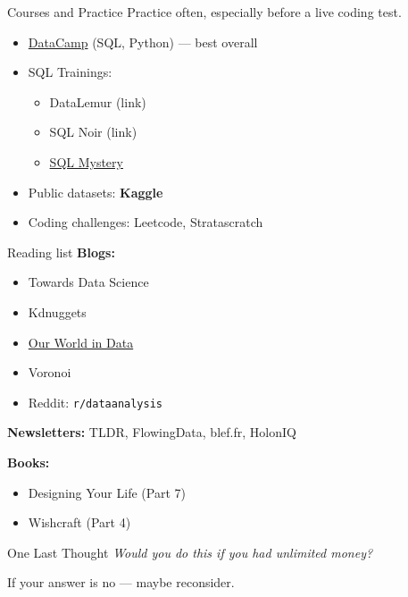 \documentclass[10pt,a4paper]{article}
\begin{document}
\begin{multicols}{3}
\begin{textboxGray}{Courses and Practice}
Practice often, especially before a live coding test.
\begin{itemize}
    \item  \href{https://datacamp.com/}{DataCamp} (SQL, Python) — best overall
    \item SQL Trainings:
    \begin{itemize}
        \item DataLemur (link)
        \item SQL Noir (link)
        \item \href{https://mystery.knightlab.com/}{SQL Mystery}
    \end{itemize}
    \item Public datasets: \textbf{Kaggle}
    \item Coding challenges: Leetcode, Stratascratch
\end{itemize}
\end{textboxGray}
\begin{textboxYellow}{Reading list}
\textbf{Blogs:}
\begin{itemize}
    \item Towards Data Science
    \item Kdnuggets
    \item \href{https://ourworldindata.org/}{Our World in Data}
    \item Voronoi
    \item Reddit: \texttt{r/dataanalysis}
\end{itemize}
\textbf{Newsletters:} TLDR, FlowingData, blef.fr, HolonIQ

\textbf{Books:}
\begin{itemize}
    \item Designing Your Life (Part 7)
    \item Wishcraft (Part 4)
\end{itemize}
\end{textboxYellow}

\begin{textbox}{One Last Thought}
\emph{Would you do this if you had unlimited money?}

If your answer is no — maybe reconsider.
\end{textbox}
\date{\today}
\end{multicols}
\end{document}
